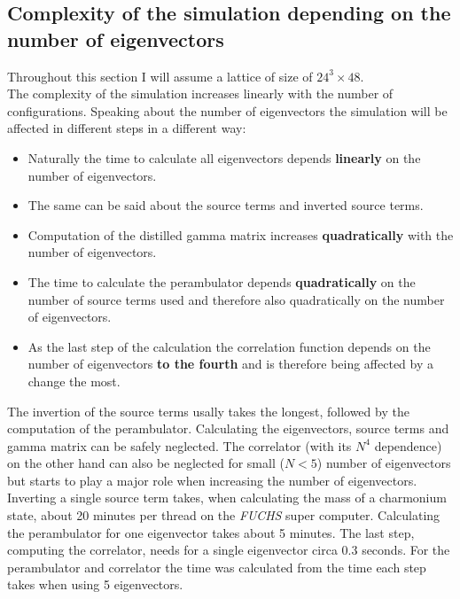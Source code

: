 \subsection{Complexity of the simulation depending on the number of eigenvectors}

Throughout this section I will assume a lattice of size of $24^3 \times 48$.\\

The complexity of the simulation increases linearly with the number of configurations. Speaking about the number of eigenvectors the simulation will be affected in different steps in a different way:\\

\begin{itemize}
    \item Naturally the time to calculate all eigenvectors depends \textbf{linearly} on the number of eigenvectors.
    \item The same can be said about the source terms and inverted source terms.
    \item Computation of the distilled gamma matrix increases \textbf{quadratically} with the number of eigenvectors.
    \item The time to calculate the perambulator depends \textbf{quadratically} on the number of source terms used and therefore also quadratically on the number of eigenvectors.
    \item As the last step of the calculation the correlation function depends on the number of eigenvectors \textbf{to the fourth} and is therefore being affected by a change the most.
\end{itemize}

The invertion of the source terms usally takes the longest, followed by the computation of the perambulator. Calculating the eigenvectors, source terms and gamma matrix can be safely neglected. The correlator (with its $N^4$ dependence) on the other hand can also be neglected for small ($N<5$) number of eigenvectors but starts to play a major role when increasing the number of eigenvectors.\\

Inverting a single source term takes, when calculating the mass of a charmonium state, about 20 minutes per thread on the \textit{FUCHS} super computer. Calculating the perambulator for one eigenvector takes about 5 minutes. The last step, computing the correlator, needs for a single eigenvector circa 0.3 seconds. For the perambulator and correlator the time was calculated from the time each step takes when using 5 eigenvectors.\\

